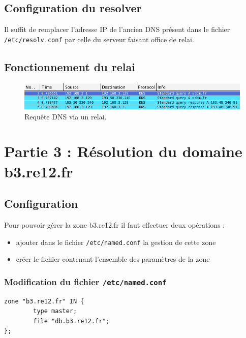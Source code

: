 \documentclass[12pt,a4paper,notitlepage]{article}
\begin{document}
\subsection{Configuration du resolver}
Il suffit de remplacer l'adresse IP de l'ancien DNS présent dans le fichier \texttt{/etc/resolv.conf} par celle du serveur faisant office de relai. 

\subsection{Fonctionnement du relai}

\begin{figure}[!h]
\begin{center}
\includegraphics[scale=0.61]{capture-via-relai}
\caption{Requête DNS via un relai.}
\label{fig:da}
\end{center}
\end{figure}



\section{Partie 3 : Résolution du domaine b3.re12.fr}

\subsection{Configuration}

Pour pouvoir gérer la zone b3.re12.fr il faut effectuer deux opérations :
\begin{itemize}
\item ajouter dans le fichier \texttt{/etc/named.conf} la gestion de cette zone
\item créer le fichier contenant l'ensemble des paramètres de la zone
\end{itemize}

\bigskip

\subsubsection{Modification du fichier \texttt{/etc/named.conf}}

\begin{lstlisting}[title=Lignes à ajouter]
zone "b3.re12.fr" IN {
        type master;
        file "db.b3.re12.fr";
};
\end{lstlisting}
\end{document}
